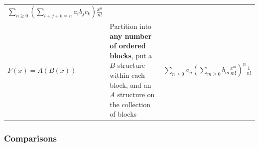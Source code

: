 \begin{longtable}[]{@{}lll@{}}
\begin{minipage}[t]{0.30\columnwidth}
\(\displaystyle\sum_{n\geq 0} \left( \displaystyle\sum_{i+j+k=n} a_i b_j c_k\right) \frac{x^n}{n!}\)\strut
\end{minipage}\tabularnewline
\begin{minipage}[t]{0.30\columnwidth}\raggedright
\(F(x) = A(B(x))\)\strut
\end{minipage} & \begin{minipage}[t]{0.30\columnwidth}\raggedright
Partition into \textbf{any number of ordered blocks}, put a \(B\)
structure within each block, and an \(A\) structure on the collection of
blocks\strut
\end{minipage} & \begin{minipage}[t]{0.30\columnwidth}\raggedright
\(\displaystyle\sum_{n\geq 0} a_n {\left( \displaystyle\sum_{m\geq 0} b_m \frac{x^m}{m!}\right)^n}\frac{1}{n!}\)\strut
\end{minipage}\tabularnewline
\bottomrule
\end{longtable}

\newpage

\hypertarget{comparisons}{%
\subsubsection{Comparisons}\label{comparisons}}

